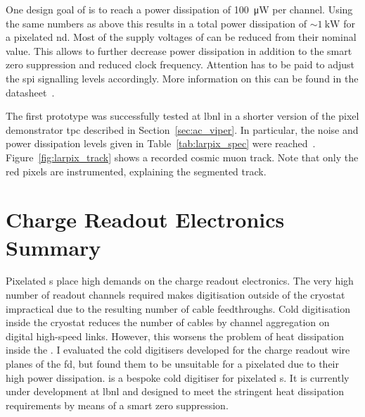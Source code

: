 One design goal of \larpix{} is to reach a power dissipation of \SI{100}{\micro\watt} per channel.
Using the same numbers as above this results in a total power dissipation of $\sim \SI{1}{\kilo\watt}$ for a pixelated \dune{} \gls{nd}.
Most of the supply voltages of \larpix{} can be reduced from their nominal value.
This allows to further decrease power dissipation in addition to the smart zero suppression and reduced clock frequency.
Attention has to be paid to adjust the \gls{spi} signalling levels accordingly.
More information on this can be found in the datasheet~\cite{larpix_spec}.

The first \larpix{} prototype was successfully tested at \gls{lbnl} in a shorter version of the pixel demonstrator \gls{tpc} described in Section~\ref{sec:ac_viper}.
In particular, the noise and power dissipation levels given in Table~\ref{tab:larpix_spec} were reached~\cite{dan_larpix_duneCM}.
Figure~\ref{fig:larpix_track} shows a recorded cosmic muon track.
Note that only the red pixels are instrumented, explaining the segmented track.

\section{Charge Readout Electronics Summary}
\label{sec:studies_electronics-summary}

Pixelated \lartpc{}s place high demands on the charge readout electronics.
The very high number of readout channels required makes digitisation outside of the cryostat impractical due to the resulting number of cable feedthroughs.
Cold digitisation inside the cryostat reduces the number of cables by channel aggregation on digital high-speed links.
However, this worsens the problem of heat dissipation inside the \lar{}.
I evaluated the cold digitisers developed for the charge readout wire planes of the \dune{} \gls{fd}, but found them to be unsuitable for a pixelated \lartpc{} due to their high power dissipation.
\larpix{} is a bespoke cold digitiser for pixelated \lartpc{}s.
It is currently under development at \gls{lbnl} and designed to meet the stringent heat dissipation requirements by means of a smart zero suppression.